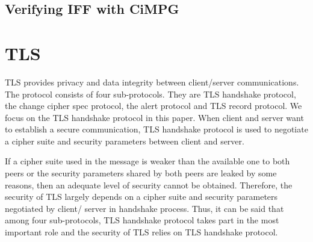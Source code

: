 \documentclass[a4paper,fleqn]{cas-dc}
\begin{document}
\subsection{Verifying IFF with CiMPG} \label{cimpg}

\section{TLS}\label{tls}
TLS \cite{dierk} provides privacy and data integrity between client/server communications. The protocol consists of four sub-protocols. They are TLS handshake protocol, the change cipher spec protocol, the alert protocol and TLS record protocol. We focus on the TLS handshake protocol in this paper. When client and server want to establish a secure communication, TLS handshake protocol is used to negotiate a cipher suite and security parameters between client and server. 


If a cipher suite used in the message is weaker than the available one to both peers or the security parameters shared by both peers are leaked by some reasons, then an adequate level of security cannot be obtained. Therefore, the security of TLS largely depends on a cipher suite and security parameters negotiated by client/ server in handshake process. Thus, it can be said that among four sub-protocols, TLS handshake protocol takes part in the most important role and the security of TLS relies on TLS handshake protocol. 
\end{document}
